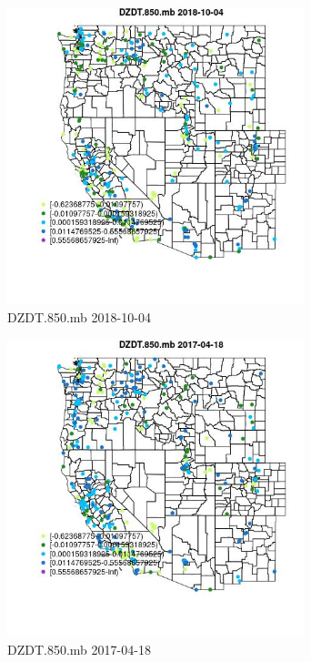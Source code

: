 \begin{figure} 
\centering  
\includegraphics[width=0.77\textwidth]{Code_Outputs/Report_ML_input_PM25_Step4_part_f_de_duplicated_aves_prioritize_24hr_obswNAs_MapObsDZDT850mb2018-10-04.jpg} 
\caption{\label{fig:Report_ML_input_PM25_Step4_part_f_de_duplicated_aves_prioritize_24hr_obswNAsMapObsDZDT850mb2018-10-04}DZDT.850.mb 2018-10-04} 
\end{figure} 
 

\begin{figure} 
\centering  
\includegraphics[width=0.77\textwidth]{Code_Outputs/Report_ML_input_PM25_Step4_part_f_de_duplicated_aves_prioritize_24hr_obswNAs_MapObsDZDT850mb2017-04-18.jpg} 
\caption{\label{fig:Report_ML_input_PM25_Step4_part_f_de_duplicated_aves_prioritize_24hr_obswNAsMapObsDZDT850mb2017-04-18}DZDT.850.mb 2017-04-18} 
\end{figure} 
 

